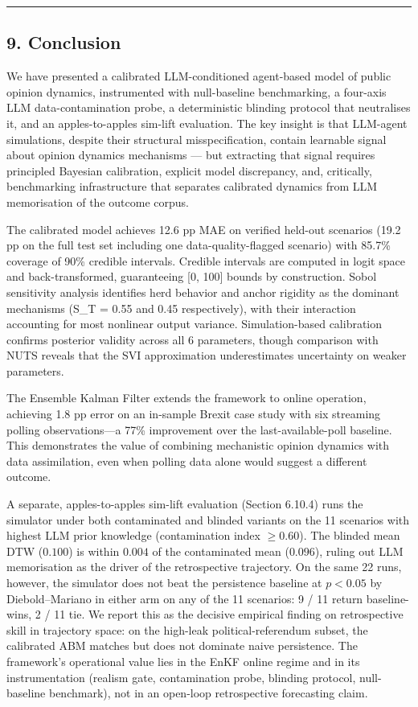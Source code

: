 \documentclass[
]{article}
\begin{document}
\begin{center}\rule{0.5\linewidth}{0.5pt}\end{center}

\subsection{9. Conclusion}\label{conclusion}

We have presented a calibrated LLM-conditioned agent-based model of
public opinion dynamics, instrumented with null-baseline benchmarking, a
four-axis LLM data-contamination probe, a deterministic blinding
protocol that neutralises it, and an apples-to-apples sim-lift
evaluation. The key insight is that LLM-agent simulations, despite their
structural misspecification, contain learnable signal about opinion
dynamics mechanisms --- but extracting that signal requires principled
Bayesian calibration, explicit model discrepancy, and, critically,
benchmarking infrastructure that separates calibrated dynamics from LLM
memorisation of the outcome corpus.

The calibrated model achieves 12.6 pp MAE on verified held-out scenarios
(19.2 pp on the full test set including one data-quality-flagged
scenario) with 85.7\% coverage of 90\% credible intervals. Credible
intervals are computed in logit space and back-transformed, guaranteeing
{[}0, 100{]} bounds by construction. Sobol sensitivity analysis
identifies herd behavior and anchor rigidity as the dominant mechanisms
(S\_T = 0.55 and 0.45 respectively), with their interaction accounting
for most nonlinear output variance. Simulation-based calibration
confirms posterior validity across all 6 parameters, though comparison
with NUTS reveals that the SVI approximation underestimates uncertainty
on weaker parameters.

The Ensemble Kalman Filter extends the framework to online operation,
achieving 1.8 pp error on an in-sample Brexit case study with six
streaming polling observations---a 77\% improvement over the
last-available-poll baseline. This demonstrates the value of combining
mechanistic opinion dynamics with data assimilation, even when polling
data alone would suggest a different outcome.

A separate, apples-to-apples sim-lift evaluation (Section 6.10.4) runs
the simulator under both contaminated and blinded variants on the 11
scenarios with highest LLM prior knowledge (contamination index
\(\geq 0.60\)). The blinded mean DTW (\(0.100\)) is within \(0.004\) of
the contaminated mean (\(0.096\)), ruling out LLM memorisation as the
driver of the retrospective trajectory. On the same 22 runs, however,
the simulator does not beat the persistence baseline at \(p<0.05\) by
Diebold--Mariano in either arm on any of the 11 scenarios: 9 / 11 return
baseline-wins, 2 / 11 tie. We report this as the decisive empirical
finding on retrospective skill in trajectory space: on the high-leak
political-referendum subset, the calibrated ABM matches but does not
dominate naive persistence. The framework's operational value lies in
the EnKF online regime and in its instrumentation (realism gate,
contamination probe, blinding protocol, null-baseline benchmark), not in
an open-loop retrospective forecasting claim.
\end{document}

